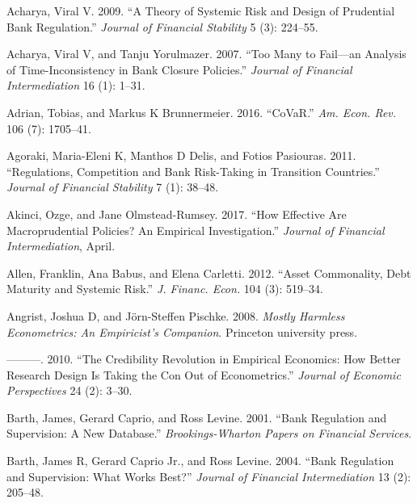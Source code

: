 \documentclass[
  10pt,
]{article}
\begin{document}
\setlength{\parindent}{-0.2in}
\setlength{\leftskip}{0.2in}
\setlength{\parskip}{8pt}
\vspace*{-0.2in}

\noindent

\hypertarget{refs}{}
\leavevmode\hypertarget{ref-Acharya2009}{}%
Acharya, Viral V. 2009. ``A Theory of Systemic Risk and Design of
Prudential Bank Regulation.'' \emph{Journal of Financial Stability} 5
(3): 224--55.

\leavevmode\hypertarget{ref-Acharya2007}{}%
Acharya, Viral V, and Tanju Yorulmazer. 2007. ``Too Many to Fail---an
Analysis of Time-Inconsistency in Bank Closure Policies.'' \emph{Journal
of Financial Intermediation} 16 (1): 1--31.

\leavevmode\hypertarget{ref-Adrian2016}{}%
Adrian, Tobias, and Markus K Brunnermeier. 2016. ``CoVaR.'' \emph{Am.
Econ. Rev.} 106 (7): 1705--41.

\leavevmode\hypertarget{ref-Agoraki2011}{}%
Agoraki, Maria-Eleni K, Manthos D Delis, and Fotios Pasiouras. 2011.
``Regulations, Competition and Bank Risk-Taking in Transition
Countries.'' \emph{Journal of Financial Stability} 7 (1): 38--48.

\leavevmode\hypertarget{ref-Akinci2017}{}%
Akinci, Ozge, and Jane Olmstead-Rumsey. 2017. ``How Effective Are
Macroprudential Policies? An Empirical Investigation.'' \emph{Journal of
Financial Intermediation}, April.

\leavevmode\hypertarget{ref-Allen2012}{}%
Allen, Franklin, Ana Babus, and Elena Carletti. 2012. ``Asset
Commonality, Debt Maturity and Systemic Risk.'' \emph{J. Financ. Econ.}
104 (3): 519--34.

\leavevmode\hypertarget{ref-angrist2008mostly}{}%
Angrist, Joshua D, and Jörn-Steffen Pischke. 2008. \emph{Mostly Harmless
Econometrics: An Empiricist's Companion}. Princeton university press.

\leavevmode\hypertarget{ref-angrist2010credibility}{}%
---------. 2010. ``The Credibility Revolution in Empirical Economics:
How Better Research Design Is Taking the Con Out of Econometrics.''
\emph{Journal of Economic Perspectives} 24 (2): 3--30.

\leavevmode\hypertarget{ref-Barth2001}{}%
Barth, James, Gerard Caprio, and Ross Levine. 2001. ``Bank Regulation
and Supervision: A New Database.'' \emph{Brookings-Wharton Papers on
Financial Services}.

\leavevmode\hypertarget{ref-Barth2004}{}%
Barth, James R, Gerard Caprio Jr., and Ross Levine. 2004. ``Bank
Regulation and Supervision: What Works Best?'' \emph{Journal of
Financial Intermediation} 13 (2): 205--48.
\end{document}

